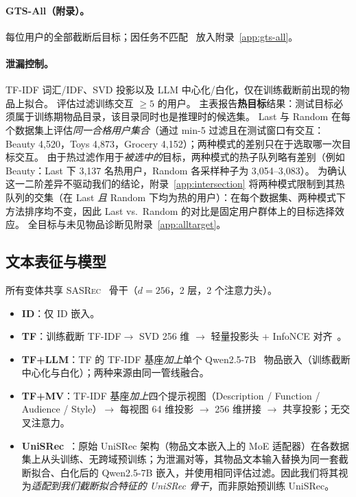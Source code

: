 \documentclass[sigconf,natbib=true,anonymous]{acmart}
\newcommand{\tfidf}{\textsc{TF-IDF}\xspace}
\newcommand{\tfllm}{\textsc{TF+LLM}\xspace}
\newcommand{\tfmv}{\textsc{TF+MV}\xspace}
\newcommand{\base}{\textsc{SASRec}\xspace}
\begin{document}
\paragraph{GTS-All（附录）。}
每位用户的全部截断后目标；因任务不匹配~\cite{gusak2025time} 放入附录~\ref{app:gts-all}。

\paragraph{泄漏控制。}
\tfidf 词汇/IDF、SVD 投影以及 LLM 中心化/白化，仅在训练截断前出现的物品上拟合。
评估过滤训练交互 $\ge 5$ 的用户。
主表报告\textbf{热目标}结果：测试目标必须属于训练期物品目录，该目录同时也是推理时的候选集。
Last 与 Random 在每个数据集上评估\emph{同一合格用户集合}（通过 min-5 过滤且在测试窗口有交互：Beauty 4{,}520，Toys 4{,}873，Grocery 4{,}152）；两种模式的差别只在于选取哪一次目标交互。
由于热过滤作用于\emph{被选中的}目标，两种模式的热子队列略有差别（例如 Beauty：Last 下 3{,}137 名热用户，Random 各采样种子为 3{,}054--3{,}083）。
为确认这一二阶差异不驱动我们的结论，附录~\ref{app:intersection} 将两种模式限制到其热队列的交集（在 Last \emph{且} Random 下均为热的用户）：在每个数据集、两种模式下方法排序均不变，因此 Last vs.\ Random 的对比是固定用户群体上的目标选择效应。
全目标与未见物品诊断见附录~\ref{app:alltarget}。

\subsection{文本表征与模型}
\label{sec:models}

所有变体共享 \base~\cite{kang2018sasrec} 骨干（$d{=}256$，2 层，2 个注意力头）。

\begin{itemize}[leftmargin=*,itemsep=1pt]
\item \textbf{ID}：仅 ID 嵌入。
\item \textbf{TF}：训练截断 \tfidf $\to$ SVD 256 维 $\to$ 轻量投影头 + InfoNCE 对齐~\cite{oord2018cpc}。
\item \textbf{\tfllm}：TF 的 \tfidf 基座\emph{加上}单个 Qwen2.5-7B~\cite{qwen2024qwen25} 物品嵌入（训练截断中心化与白化）；两种来源由同一管线融合。
\item \textbf{\tfmv}：\tfidf 基座\emph{加上}四个提示视图（Description / Function / Audience / Style）$\to$ 每视图 64 维投影 $\to$ 256 维拼接 $\to$ 共享投影；无交叉注意力。
\item \textbf{UniSRec}~\cite{hou2022unisrec}：原始 UniSRec 架构（物品文本嵌入上的 MoE 适配器）在各数据集上从头训练、无跨域预训练；为泄漏对等，其物品文本输入替换为同一套截断拟合、白化后的 Qwen2.5-7B 嵌入，并使用相同评估过滤。因此我们将其视为\emph{适配到我们截断拟合特征的 UniSRec 骨干}，而非原始预训练 UniSRec。
\end{itemize}
\end{document}
